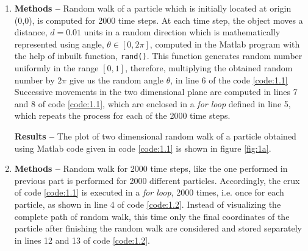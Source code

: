 \documentclass[a4paper]{article}
\begin{document}
		\begin{enumerate} [label*=\textbf{(\alph*)}]
			
			
			\item 
				\subitem \textbf{Methods  --} 
					Random walk of a particle which is initially located at origin (0,0), is computed for 2000 time steps. At each time step, the object moves a distance, \(d=0.01\) units in a random direction which is mathematically represented using angle, \(\theta \in [0,2\pi]\), computed in the Matlab program with the help of inbuilt function, \texttt{rand()}. This function generates random number uniformly in the range \([0,1]\), therefore, multiplying the obtained random number by \(2\pi\) give us the random angle \(\theta\), in line 6 of the code \ref{code:1.1} Successive movements in the two dimensional plane are computed in lines 7 and 8 of code \ref{code:1.1}, which are enclosed in a \emph{for loop} defined in line 5, which repeats the process for each of the 2000 time steps.
					
					\begin{figure} [h]
						
					\end{figure}
					
				\subitem \textbf{Results --} 
					The plot of two dimensional random walk of a particle obtained using Matlab code given in code \ref{code:1.1} is shown in figure \ref{fig:1a}.
				
			
			
			\item 
				\subitem \textbf{Methods  --} 
					Random walk for 2000 time steps, like the one performed in previous part is performed for 2000 different particles. Accordingly, the crux of code \ref{code:1.1} is executed in a \emph{for loop}, 2000 times, i.e. once for each particle, as shown in line 4 of code \ref{code:1.2}. Instead of visualizing the complete path of random walk, this time only the final coordinates of the particle after finishing the random walk are considered and stored separately in lines 12 and 13 of code \ref{code:1.2}.   
					
					\begin{figure} [h]
						
					\end{figure}
					

\end{enumerate}
\end{document}
